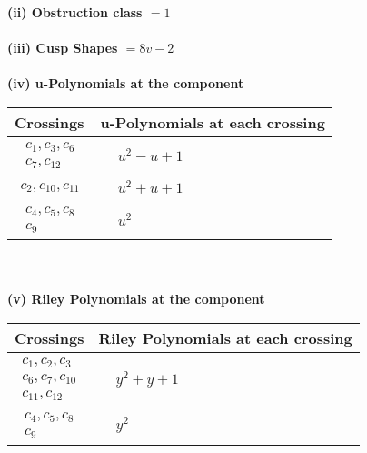 \documentclass[1p]{elsarticle_modified}
\theoremstyle{definition}
\begin{document}
\flushleft \textbf{(ii) Obstruction class $= 1$}\\~\\
\flushleft \textbf{(iii) Cusp Shapes $= 8 v-2$}\\~\\
\newpage\renewcommand{\arraystretch}{1}
\flushleft \textbf{(iv) u-Polynomials at the component}\newline \\
\begin{tabular}{m{50pt}|m{274pt}}
Crossings & \hspace{64pt}u-Polynomials at each crossing \\
\hline $$\begin{aligned}c_{1},c_{3},c_{6}\\c_{7},c_{12}\end{aligned}$$&$\begin{aligned}
&u^2- u+1
\end{aligned}$\\
\hline $$\begin{aligned}c_{2},c_{10},c_{11}\end{aligned}$$&$\begin{aligned}
&u^2+u+1
\end{aligned}$\\
\hline $$\begin{aligned}c_{4},c_{5},c_{8}\\c_{9}\end{aligned}$$&$\begin{aligned}
&u^2
\end{aligned}$\\
\hline
\end{tabular}\\~\\
\newpage\renewcommand{\arraystretch}{1}
\flushleft \textbf{(v) Riley Polynomials at the component}\newline \\
\begin{tabular}{m{50pt}|m{274pt}}
Crossings & \hspace{64pt}Riley Polynomials at each crossing \\
\hline $$\begin{aligned}c_{1},c_{2},c_{3}\\c_{6},c_{7},c_{10}\\c_{11},c_{12}\end{aligned}$$&$\begin{aligned}
&y^2+y+1
\end{aligned}$\\
\hline $$\begin{aligned}c_{4},c_{5},c_{8}\\c_{9}\end{aligned}$$&$\begin{aligned}
&y^2
\end{aligned}$\\
\hline
\end{tabular}\\~\\
\end{document}
